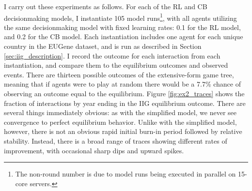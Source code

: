 I carry out these experiments as follows. For each of the RL and CB decisionmaking models, I instantiate 105 model runs\footnote{The non-round number is due to model runs being executed in parallel on 15-core servers.}, with all agents utilizing the same decisionmaking model with fixed learning rates: 0.1 for the RL model, and 0.2 for the CB model. Each instantiation includes one agent for each unique country in the EUGene dataset, and is run as described in Section \ref{sec:iig_description}. I record the outcome for each interaction from each instantiation, and compare them to the equilibrium outcomes and observed events. There are thirteen possible outcomes of the extensive-form game tree, meaning that if agents were to play at random there would be a 7.7\% chance of observing an outcome equal to the equilibrium. Figure \ref{fig:ex2_traces} shows the fraction of interactions by year ending in the IIG equilibrium outcome. There are several things immediately obvious: as with the simplified model, we never see convergence to perfect equilibrium behavior. Unlike with the simplified model, however, there is not an obvious rapid initial burn-in period followed by relative stability. Instead, there is a broad range of traces showing different rates of improvement, with occasional sharp dips and upward spikes. 


